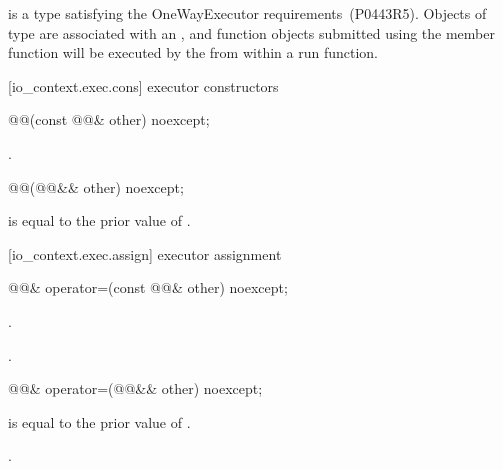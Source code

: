 \pnum
{} is a type satisfying the OneWayExecutor requirements~(P0443R5). Objects of type  are associated with an , and function objects submitted using the  member function will be executed by the  from within a run function.


[io_context.exec.cons]{ executor constructors}

%
\begin{itemdecl}
@@(const @@& other) noexcept;
\end{itemdecl}

\begin{itemdescr}
\pnum
\postconditions {}.
\end{itemdescr}

\begin{itemdecl}
@@(@@&& other) noexcept;
\end{itemdecl}

\begin{itemdescr}
\pnum
\postconditions {} is equal to the prior value of .
\end{itemdescr}



[io_context.exec.assign]{ executor assignment}

%
\begin{itemdecl}
@@& operator=(const @@& other) noexcept;
\end{itemdecl}

\begin{itemdescr}
\pnum
\postconditions {}.

\pnum
\returns {}.
\end{itemdescr}

\begin{itemdecl}
@@& operator=(@@&& other) noexcept;
\end{itemdecl}

\begin{itemdescr}
\pnum
\postconditions {} is equal to the prior value of .

\pnum
\returns {}.
\end{itemdescr}



